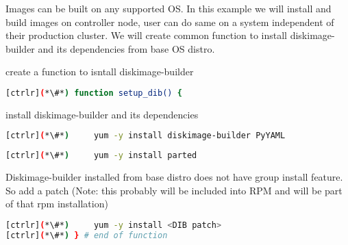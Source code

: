 
Images can be built on any supported OS. In this example we will install and build images on controller node, user can do same on a system independent of their production cluster. We will create common function to install diskimage-builder and its dependencies from base OS distro.

create a function to isntall diskimage-builder
\begin{lstlisting}[language=bash,keywords={}]
[ctrlr](*\#*) function setup_dib() {
\end{lstlisting}
install diskimage-builder and its dependencies
\begin{lstlisting}[language=bash,keywords={}]
[ctrlr](*\#*)     yum -y install diskimage-builder PyYAML

\end{lstlisting}

\begin{lstlisting}[language=bash,keywords={}]
[ctrlr](*\#*)     yum -y install parted
\end{lstlisting}

Diskimage-builder installed from base distro does not have group install feature. So add a patch (Note: this probably will be included into RPM and will be part of that rpm installation)

\begin{lstlisting}[language=bash,keywords={}]
[ctrlr](*\#*)     yum -y install <DIB patch>
[ctrlr](*\#*) } # end of function
\end{lstlisting}
